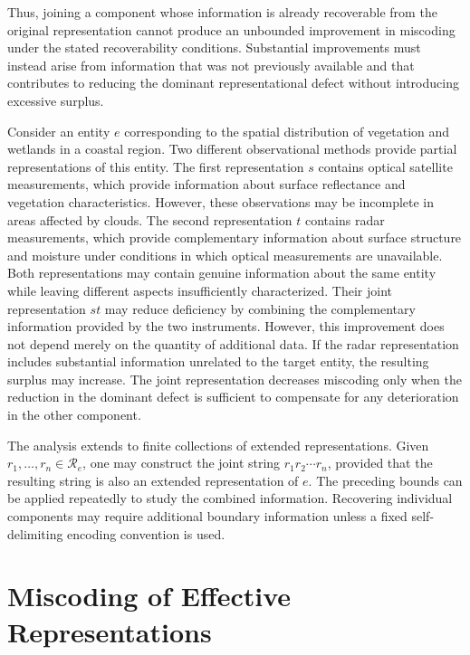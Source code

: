 Thus, joining a component whose information is already recoverable from the original representation cannot produce an unbounded improvement in miscoding under the stated recoverability conditions. Substantial improvements must instead arise from information that was not previously available and that contributes to reducing the dominant representational defect without introducing excessive surplus.

\begin{example}
Consider an entity $e$ corresponding to the spatial distribution of vegetation and wetlands in a coastal region. Two different observational methods provide partial representations of this entity. The first representation $s$ contains optical satellite measurements, which provide information about surface reflectance and vegetation characteristics. However, these observations may be incomplete in areas affected by clouds. The second representation $t$ contains radar measurements, which provide complementary information about surface structure and moisture under conditions in which optical measurements are unavailable. Both representations may contain genuine information about the same entity while leaving different aspects insufficiently characterized. Their joint representation $st$ may reduce deficiency by combining the complementary information provided by the two instruments. However, this improvement does not depend merely on the quantity of additional data. If the radar representation includes substantial information unrelated to the target entity, the resulting surplus may increase. The joint representation decreases miscoding only when the reduction in the dominant defect is
sufficient to compensate for any deterioration in the other component.
\end{example}

The analysis extends to finite collections of extended representations. Given $r_1,\ldots,r_n\in\mathcal R_e$, one may construct the joint string $r_1r_2\cdots r_n$, provided that the resulting string is also an extended representation of $e$. The preceding bounds can be applied repeatedly to study the combined information. Recovering individual components may require additional boundary information unless a fixed self-delimiting
encoding convention is used.


%
%

\section{Miscoding of Effective Representations}
\label{sec:effective_miscoding}

